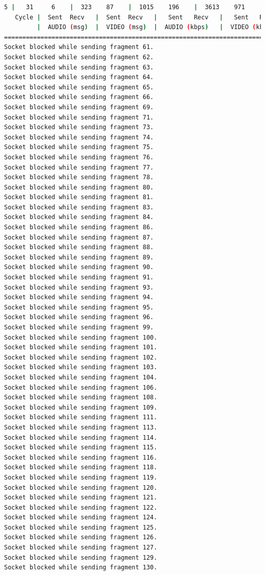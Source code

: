 \begin{lstlisting}[language=bash,basicstyle=\ttfamily\tiny]
       5 |   31     6    |  323    87    |  1015    196    |  3613    971    |  33     68       
   Cycle |  Sent  Recv   |  Sent  Recv   |   Sent   Recv   |   Sent   Recv   | Program System
         |  AUDIO (msg)  |  VIDEO (msg)  |  AUDIO (kbps)   |  VIDEO (kbps)   |     CPU (%) 
===========================================================================================
Socket blocked while sending fragment 61.
Socket blocked while sending fragment 62.
Socket blocked while sending fragment 63.
Socket blocked while sending fragment 64.
Socket blocked while sending fragment 65.
Socket blocked while sending fragment 66.
Socket blocked while sending fragment 69.
Socket blocked while sending fragment 71.
Socket blocked while sending fragment 73.
Socket blocked while sending fragment 74.
Socket blocked while sending fragment 75.
Socket blocked while sending fragment 76.
Socket blocked while sending fragment 77.
Socket blocked while sending fragment 78.
Socket blocked while sending fragment 80.
Socket blocked while sending fragment 81.
Socket blocked while sending fragment 83.
Socket blocked while sending fragment 84.
Socket blocked while sending fragment 86.
Socket blocked while sending fragment 87.
Socket blocked while sending fragment 88.
Socket blocked while sending fragment 89.
Socket blocked while sending fragment 90.
Socket blocked while sending fragment 91.
Socket blocked while sending fragment 93.
Socket blocked while sending fragment 94.
Socket blocked while sending fragment 95.
Socket blocked while sending fragment 96.
Socket blocked while sending fragment 99.
Socket blocked while sending fragment 100.
Socket blocked while sending fragment 101.
Socket blocked while sending fragment 102.
Socket blocked while sending fragment 103.
Socket blocked while sending fragment 104.
Socket blocked while sending fragment 106.
Socket blocked while sending fragment 108.
Socket blocked while sending fragment 109.
Socket blocked while sending fragment 111.
Socket blocked while sending fragment 113.
Socket blocked while sending fragment 114.
Socket blocked while sending fragment 115.
Socket blocked while sending fragment 116.
Socket blocked while sending fragment 118.
Socket blocked while sending fragment 119.
Socket blocked while sending fragment 120.
Socket blocked while sending fragment 121.
Socket blocked while sending fragment 122.
Socket blocked while sending fragment 124.
Socket blocked while sending fragment 125.
Socket blocked while sending fragment 126.
Socket blocked while sending fragment 127.
Socket blocked while sending fragment 129.
Socket blocked while sending fragment 130.

\end{lstlisting}
